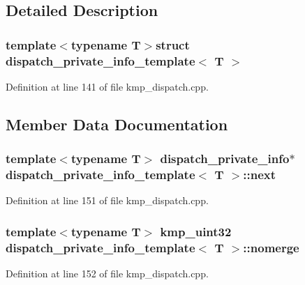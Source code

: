 \subsection{Detailed Description}
\subsubsection*{template$<$typename T$>$struct dispatch\-\_\-private\-\_\-info\-\_\-template$<$ T $>$}



Definition at line 141 of file kmp\-\_\-dispatch.\-cpp.



\subsection{Member Data Documentation}
\hypertarget{structdispatch__private__info__template_ae8e55887736b25c568047bbc0f2a84d1}{
\subsubsection[{next}]{\setlength{\rightskip}{0pt plus 5cm}template$<$typename T$>$ {\bf dispatch\-\_\-private\-\_\-info}$\ast$ {\bf dispatch\-\_\-private\-\_\-info\-\_\-template}$<$ T $>$\-::next}}\label{structdispatch__private__info__template_ae8e55887736b25c568047bbc0f2a84d1}


Definition at line 151 of file kmp\-\_\-dispatch.\-cpp.

\hypertarget{structdispatch__private__info__template_a173b2536a5a9e9dc1945f77dc0497683}{
\subsubsection[{nomerge}]{\setlength{\rightskip}{0pt plus 5cm}template$<$typename T$>$ kmp\-\_\-uint32 {\bf dispatch\-\_\-private\-\_\-info\-\_\-template}$<$ T $>$\-::nomerge}}\label{structdispatch__private__info__template_a173b2536a5a9e9dc1945f77dc0497683}


Definition at line 152 of file kmp\-\_\-dispatch.\-cpp.



